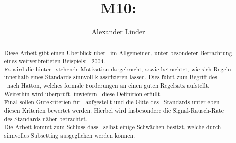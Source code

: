\documentclass[a4paper,UKenglish,cleveref, autoref]{templates/lipics-v2019}
\title{M10: \sqss}
\author{Alexander Linder}{Karlsruhe Institute of Technology, Germany \and \url{https://kit.edu} }{alexander.linder@student.kit.edu}{}{}
\begin{document}
    \maketitle

    \begin{abstract}
        Diese Arbeit gibt einen Überblick über \sqss\ im Allgemeinen, unter besonderer Betrachtung eines weitverbreiteten Beispiels: \misra\ 2004.\\
        Es wird die hinter \sqss\ stehende Motivation dargebracht, sowie betrachtet, wie sich Regeln innerhalb eines Standards sinnvoll klassifizieren lassen.
        Dies führt zum Begriff des \slss\ nach Hatton, welches formale Forderungen an einen guten Regelsatz aufstellt.
        Weiterhin wird überprüft, inwiefern \misra\ diese Definition erfüllt.\\
        Final sollen Gütekriterien für \sqss\ aufgestellt und die Güte des \misra\ Standards unter eben diesen Kriterien bewertet werden.
        Hierbei wird insbesondere die Signal-Rausch-Rate des Standards näher betrachtet.\\
        Die Arbeit kommt zum Schluss dass \misra\ selbst einige Schwächen besitzt, welche durch sinnvolles Subsetting
        ausgeglichen werden können.
    \end{abstract}
\end{document}
